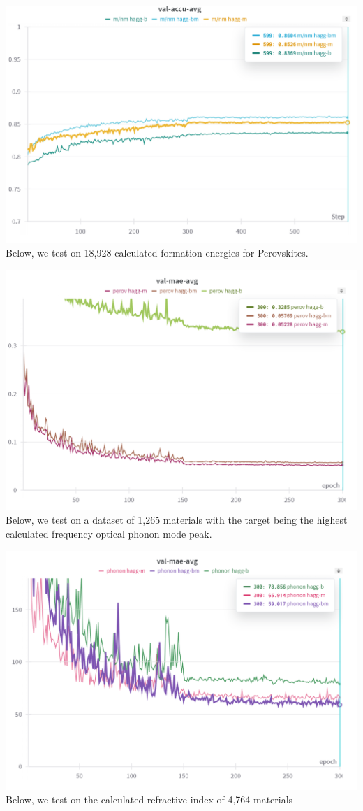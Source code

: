 \documentclass[10pt,a4paper]{article}
\begin{document}
\includegraphics[scale=0.84]{metal_nonmetal.png}
Below, we test on 18,928 calculated formation energies for Perovskites.

\includegraphics[scale=0.84]{perovskites.png}
Below, we test on a dataset of 1,265 materials with the target being the highest calculated frequency optical phonon mode peak.

\includegraphics[scale=0.84]{phonons.png}
Below, we test on the calculated refractive index of 4,764 materials
\end{document}
